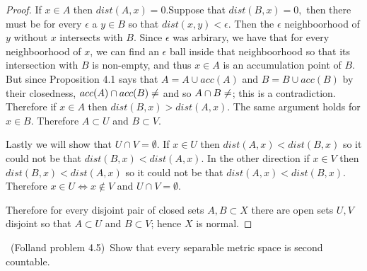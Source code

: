 \documentclass[11pt]{amsart}
\theoremstyle{definition}
\numberwithin{theorem}{section}
\numberwithin{definition}{section}
\numberwithin{equation}{section}
\begin{document}
\begin{proof}
 	If $x \in A$ then $dist(A,x) = 0.$Suppose that $dist(B,x) = 0,$ then there must be for every $\epsilon$ a $y \in B$ so that $dist(x,y) < \epsilon.$ Then the $\epsilon$ neighboorhood of $y$ without $x$ intersects with $B$. Since $\epsilon$ was arbirary, we have that for every neighboorhood of $x$, we can find an $\epsilon$ ball inside that neighboorhood so that its intersection with $B$ is non-empty, and thus $x \in A$ is an accumulation point of $B$. But since Proposition 4.1 says that $A = A \cup acc(A)$ and $B = B \cup acc(B)$ by their closedness, $acc(A) \cap acc(B) \neq \empty$ and so $A \cap B \neq \empty$; this is a contradiction. Therefore if $x \in A$ then $dist(B,x) > dist(A,x).$ The same argument holds for $x \in B$. Therefore $A \subset U$ and $B \subset V.$

 	Lastly we will show that $U \cap V = \emptyset.$ If $x \in U$ then $dist(A,x) < dist(B,x)$ so it could not be that $dist(B,x) < dist(A,x).$ In the other direction if $x \in V$ then $dist(B,x) < dist(A,x)$ so it could not be that $dist(A,x) < dist(B,x)$. Therefore $x \in U \iff x \notin V$ and $U \cap V = \emptyset.$

 	Therefore for every disjoint pair of closed sets $A,B \subset X$ there are open sets $U, V$ disjoint so that $A \subset U$ and $B \subset V$; hence $X$ is normal.
 \end{proof}
\medskip {}\ (Folland problem 4.5)\ Show that every separable metric space is second countable.
\end{document}
